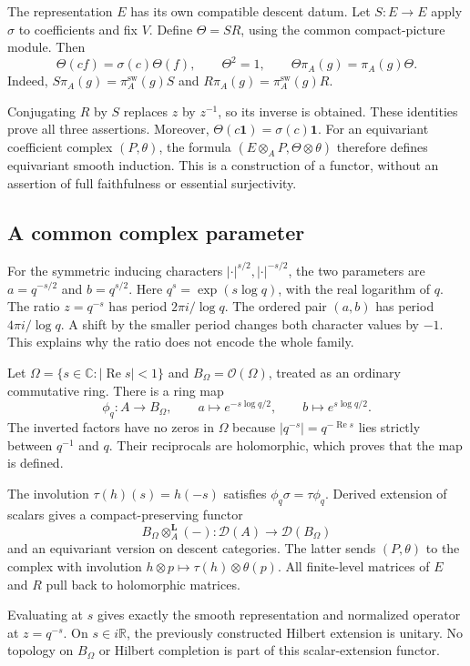 The representation $E$ has its own compatible descent datum.
Let $S:E\to E$ apply $\sigma$ to coefficients and fix $V$.
Define $\Theta=SR$, using the common compact-picture module.
Then
\[
 \Theta(c f)=\sigma(c)\Theta(f),\qquad
 \Theta^2=1,\qquad \Theta\pi_A(g)=\pi_A(g)\Theta.
\]
Indeed, $S\pi_A(g)=\pi_A^{\mathrm{sw}}(g)S$ and
$R\pi_A(g)=\pi_A^{\mathrm{sw}}(g)R$.

Conjugating $R$ by $S$ replaces $z$ by $z^{-1}$, so its inverse is obtained.
These identities prove all three assertions.
Moreover, $\Theta(c\mathbf1)=\sigma(c)\mathbf1$.
For an equivariant coefficient complex $(P,\theta)$, the formula
$(E\otimes_A P,\Theta\otimes\theta)$ therefore defines equivariant smooth induction.
This is a construction of a functor, without an assertion of full faithfulness or essential surjectivity.

\subsection{A common complex parameter}

For the symmetric inducing characters $|\cdot|^{s/2},|\cdot|^{-s/2}$,
the two parameters are $a=q^{-s/2}$ and $b=q^{s/2}$.
Here $q^s=\exp(s\log q)$, with the real logarithm of $q$.
The ratio $z=q^{-s}$ has period $2\pi i/\log q$.
The ordered pair $(a,b)$ has period $4\pi i/\log q$.
A shift by the smaller period changes both character values by $-1$.
This explains why the ratio does not encode the whole family.

Let $\Omega=\{s\in\mathbb C:|\operatorname{Re}s|<1\}$ and
$B_\Omega=\mathcal O(\Omega)$, treated as an ordinary commutative ring.
There is a ring map
\[
 \phi_q:A\longrightarrow B_\Omega,\qquad
 a\longmapsto e^{-s\log q/2},\qquad b\longmapsto e^{s\log q/2}.
\]
The inverted factors have no zeros in $\Omega$ because
$|q^{-s}|=q^{-\operatorname{Re}s}$ lies strictly between $q^{-1}$ and $q$.
Their reciprocals are holomorphic, which proves that the map is defined.

The involution $\tau(h)(s)=h(-s)$ satisfies $\phi_q\sigma=\tau\phi_q$.
Derived extension of scalars gives a compact-preserving functor
\[
 B_\Omega\otimes_A^{\mathbf L}(-):\mathcal D(A)\longrightarrow\mathcal D(B_\Omega)
\]
and an equivariant version on descent categories.
The latter sends $(P,\theta)$ to the complex with involution
$h\otimes p\mapsto\tau(h)\otimes\theta(p)$.
All finite-level matrices of $E$ and $R$ pull back to holomorphic matrices.

Evaluating at $s$ gives exactly the smooth representation and normalized
operator at $z=q^{-s}$.
On $s\in i\mathbb R$, the previously constructed Hilbert extension is unitary.
No topology on $B_\Omega$ or Hilbert completion is part of this scalar-extension functor.

